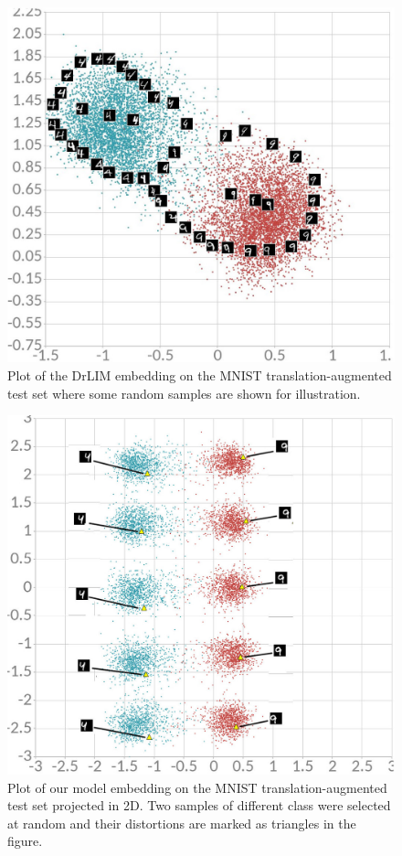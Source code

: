 \documentclass[a4paper,12pt]{report}
\begin{document}
\begin{figure}[h]
    \centering
    \includegraphics{thesis_figures/mnist_cl_drlim.jpg}
    \caption{Plot of the DrLIM embedding on the MNIST translation-augmented test set where some random samples are shown for illustration.}
    \label{fig:mnist_cl_drlim}
\end{figure}

\begin{figure}
    \centering
    \includegraphics[width=\textwidth]{thesis_figures/mnist_cl2d.jpg}
    \caption{Plot of our model embedding on the MNIST translation-augmented test set projected in 2D. Two samples of different class were selected at random and their distortions are marked as triangles in the figure.}
    \label{fig:mnist_cl2d_1}
\end{figure}
\end{document}
